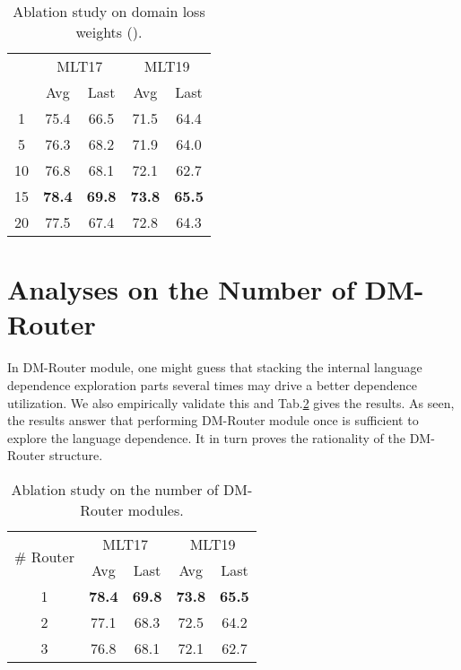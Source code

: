 \documentclass[10pt,twocolumn,letterpaper]{article}
\begin{document}
\begin{table}[]
\begin{center}
\begin{tabular}{c|cc|cc}
\hline
\multirow{2}{*}{} & \multicolumn{2}{c|}{MLT17}    & \multicolumn{2}{c}{MLT19}     \\ \cline{2-5} 
                           & Avg           & Last          & Avg           & Last          \\ \hline
1                          & 75.4          & 66.5          & 71.5          & 64.4          \\
5                          & 76.3          & 68.2          & 71.9          & 64.0          \\
10                         & 76.8          & 68.1          & 72.1          & 62.7          \\
15                         & \textbf{78.4} & \textbf{69.8} & \textbf{73.8} & \textbf{65.5} \\
20                         & 77.5          & 67.4          & 72.8          & 64.3          \\ \hline
\end{tabular}
\end{center}
\caption{Ablation study on domain loss weights ().}
\label{table:para_a}
\end{table}


\section{Analyses on the Number of DM-Router}

In DM-Router module, one might guess that stacking the internal language dependence exploration parts several times may drive a better dependence utilization. We also empirically validate this and Tab.\ref{table:num_dm} gives the results. As seen, the results answer that performing DM-Router module once is sufficient to explore the language dependence. It in turn proves the rationality of the DM-Router structure.
\begin{table}[]
\begin{center}
\begin{tabular}{c|cc|cc}
\hline
\multirow{2}{*}{\# Router} & \multicolumn{2}{c|}{MLT17}    & \multicolumn{2}{c}{MLT19}     \\ \cline{2-5} 
                         & Avg           & Last          & Avg           & Last          \\ \hline
1                         & \textbf{78.4} & \textbf{69.8} & \textbf{73.8} & \textbf{65.5} \\
2                         & 77.1          & 68.3          & 72.5          & 64.2          \\
3                         & 76.8          & 68.1          & 72.1          & 62.7          \\
\hline       
\end{tabular}
\end{center}
\caption{Ablation study on the number of DM-Router modules.}
\label{table:num_dm}
\end{table}
\end{document}
